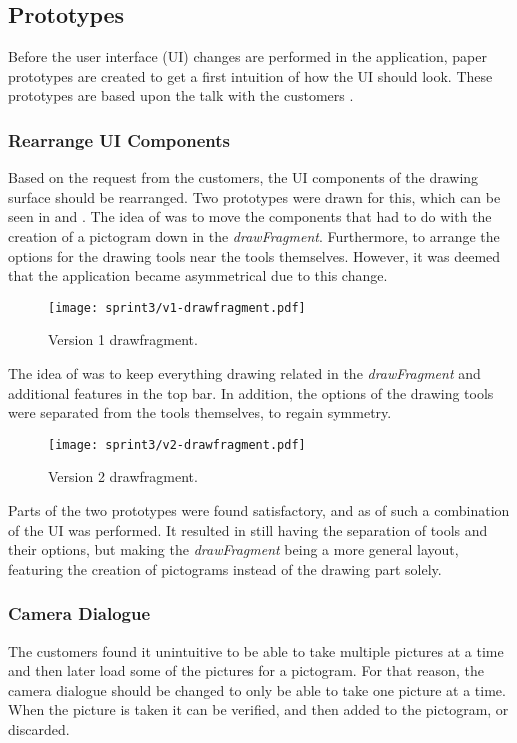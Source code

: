 \subsection{Prototypes}
Before the user interface (UI) changes are performed in the application, paper prototypes are created to get a first intuition of how the UI should look.
These prototypes are based upon the talk with the customers \citep{misc:drazenko, misc:pernille}.
 
\subsubsection*{Rearrange UI Components}
Based on the request from the customers, the UI components of the drawing surface should be rearranged.
Two prototypes were drawn for this, which can be seen in  and .
The idea of  was to move the components that had to do with the creation of a pictogram down in the \textit{drawFragment}. Furthermore, to arrange the options for the drawing tools near the tools themselves.
However, it was deemed that the application became asymmetrical due to this change.

\begin{figure}[h]
     \centering
     \texttt{[image: sprint3/v1-drawfragment.pdf]}
     \caption{Version 1 drawfragment.}
     \label{fig:v1drawfrag}
\end{figure}

The idea of  was to keep everything drawing related in the \textit{drawFragment} and additional features in the top bar. In addition, the options of the drawing tools were separated from the tools themselves, to regain symmetry.

\begin{figure}[h]
     \centering
     \texttt{[image: sprint3/v2-drawfragment.pdf]}
     \caption{Version 2 drawfragment.}
     \label{fig:v2drawfrag}
\end{figure}

Parts of the two prototypes were found satisfactory, and as of such a combination of the UI was performed.
It resulted in still having the separation of tools and their options, but making the \textit{drawFragment} being a more general layout, featuring the creation of pictograms instead of the drawing part solely.

\subsubsection*{Camera Dialogue}
The customers found it unintuitive to be able to take multiple pictures at a time and then later load some of the pictures for a pictogram.
For that reason, the camera dialogue should be changed to only be able to take one picture at a time.
When the picture is taken it can be verified, and then added to the pictogram, or discarded.

